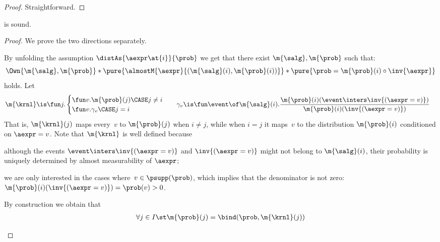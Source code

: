 \documentclass[acmsmall,nonacm,screen,appendix]{acmart}
\begin{document}
\begin{proof}
  Straightforward.
\end{proof} \begin{lemma}
\label{proof:c-unit-r}
   is sound.
\end{lemma}

\begin{proof}
  We prove the two directions separately.

  \begin{casesplit}
  \case*[Forward direction $\distAs{\aexpr\at{i}}{\prob} \proves \CC\prob v.\sure{\aexpr\at{i} = v}$]
    By unfolding the assumption $\distAs{\aexpr\at{i}}{\prob}$ we get
    that there exist $\m{\salg},\m{\prob}$ such that:
    \[
      \Own{\m{\salg},\m{\prob}}
      *
      \pure{
        \almostM{\aexpr}{(\m{\salg}(i),\m{\prob}(i))}
      }
      *
      \pure{
        \prob = \m{\prob}(i) \circ \inv{\aexpr}
      }
    \]
    holds.
    Let
    \begin{align*}
      \m{\krnl} &\is
      \fun j.
        \begin{cases}
          \fun v. \m{\prob}(j) \CASE j \ne i
          \\
          \fun v. \gamma_v     \CASE j=i
        \end{cases}
      &
      \gamma_v &\is
        \fun \event \of \m{\salg}(i).
          \frac{\m{\prob}(i)(\event \inters \inv{(\aexpr=v)})}
               {\m{\prob}(i)(\inv{(\aexpr=v)})}
    \end{align*}
    That is, $\m{\krnl}(j)$ maps every~$v$ to $\m{\prob}(j)$ when $i\ne j$,
    while when $i=j$ it maps~$v$ to the distribution $\m{\prob}(i)$ conditioned on $\aexpr=v$.
    Note that $\m{\krnl}$ is well defined because
    \begin{enumerate*}
      \item
        although the events
        $\event \inters \inv{(\aexpr=v)}$ and
        $\inv{(\aexpr=v)}$
        might not belong to $\m{\salg}(i)$,
        their probability is uniquely determined
        by almost measurability of $\aexpr$;
      \item
        we are only interested in the cases where~$v \in \psupp(\prob)$,
        which implies that the denominator is not zero:
        $\m{\prob}(i)(\inv{(\aexpr=v)}) = \prob(v) > 0$.
    \end{enumerate*}
    By construction we obtain that
    \begin{gather}
      \forall j \in I\st
        \m{\prob}(j) = \bind(\prob, \m{\krnl}(j))

\end{gather}
\end{casesplit}
\end{proof}
\end{document}
